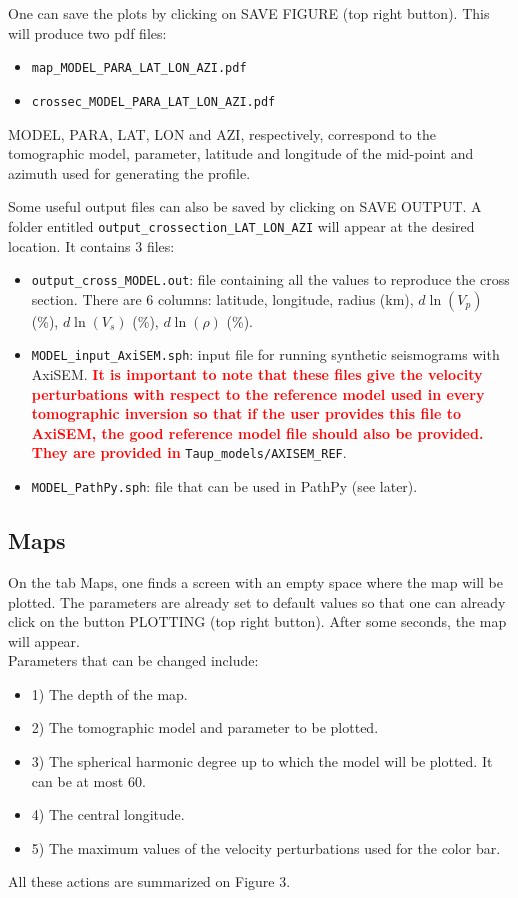 \documentclass[12pt]{article}
\begin{document}
One can save the plots by clicking on SAVE FIGURE (top right button). This will produce two pdf files:
\begin{itemize}
\item
  \verb?map_MODEL_PARA_LAT_LON_AZI.pdf?
\item
 \verb?crossec_MODEL_PARA_LAT_LON_AZI.pdf?
\end{itemize}
MODEL, PARA, LAT, LON and AZI, respectively, correspond to the tomographic
model,  parameter, latitude and longitude of the mid-point and
 azimuth used for generating the profile.

Some useful output files can also be saved by clicking on SAVE OUTPUT. A
folder entitled \verb?output_crossection_LAT_LON_AZI? will appear at
the desired location. It contains 3 files:

\begin{itemize}
\item
  \verb?output_cross_MODEL.out?: file containing all the values to reproduce
  the cross section. There are 6 columns: latitude, longitude, radius
  (km), \(d\ln(V_p)\) (\%), \(d\ln(V_s)\) (\%), \(d\ln(\rho)\) (\%).
\item \verb?MODEL_input_AxiSEM.sph?: input file for running synthetic seismograms
  with AxiSEM.   \textcolor{red}{\textbf{It is important to note that these files give the velocity perturbations with respect to the reference model used in every tomographic inversion so that if the user provides  this file to AxiSEM, the good reference model file should also be provided. They are provided in }} \verb|Taup_models/AXISEM_REF|.
\item
  \verb?MODEL_PathPy.sph?: file that can be used in PathPy (see later).
\end{itemize}

\subsection{Maps}\label{mappy}

On the tab Maps, one finds a screen with an empty space  where the map will be plotted. The parameters are already set
to default values so that one can already click on the button PLOTTING
(top right button). After some seconds, the map will appear.\\

Parameters that can be changed include: 

\begin{itemize}
\item 1) The depth of the map.
\item 2) The tomographic model and parameter to be plotted.
 \item 3) The spherical harmonic degree up to which the model will be plotted.
    It can be at most 60.
\item 4) The central longitude.
\item 5) The maximum values of the velocity perturbations used for the
    color bar.
\end{itemize}
All these actions are summarized on Figure 3.
\end{document}
